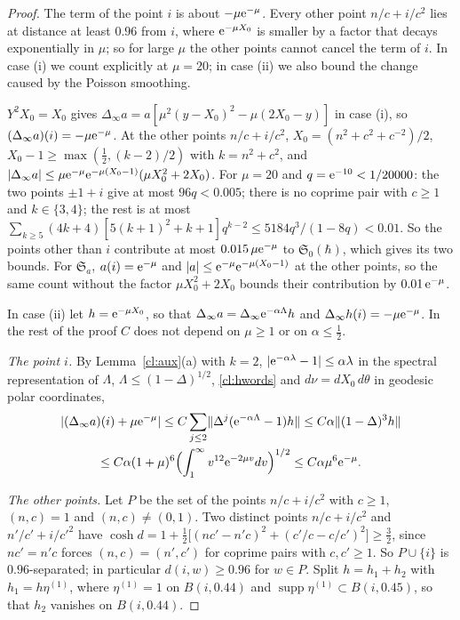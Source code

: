 \begin{proof}
The term of the point $i$ is about $-\mu\mathrm{e}^{-\mu}$. Every other point $n/c+i/c^2$ lies at distance at least $0.96$ from $i$, where
$\mathrm{e}^{-\mu X_0}$ is smaller by a factor that decays exponentially in $\mu$; so for large $\mu$ the other points cannot cancel the
term of $i$. In case (i) we count explicitly at $\mu=20$; in case (ii) we also bound the change caused by the Poisson smoothing.

$Y^2X_0=X_0$ gives $\Delta_\infty a=a[\mu^2(y-X_0)^2-\mu(2X_0-y)]$ in case (i), so $(\Delta_\infty a)(i)=-\mu\mathrm{e}^{-\mu}$. At the other points $n/c+i/c^2$,
$X_0=(n^2+c^2+c^{-2})/2$, $X_0-1\ge\max(\tfrac12,(k-2)/2)$ with $k=n^2+c^2$, and $|\Delta_\infty a|\le\mu\mathrm{e}^{-\mu}\mathrm{e}^{-\mu(X_0-1)}(\mu X_0^2+2X_0)$. For
$\mu=20$ and $q=\mathrm{e}^{-10}<1/20000$: the two points $\pm1+i$ give at most $96q<0.005$; there is no coprime pair with $c\ge1$ and $k\in\{3,4\}$; the rest is
at most $\sum_{k\ge5}(4k+4)[5(k+1)^2+k+1]q^{k-2}\le5184q^3/(1-8q)<0.01$. So the points other than $i$ contribute at most
$0.015\,\mu\mathrm{e}^{-\mu}$ to $\mathfrak S_0(\hbar)$, which gives its two bounds. For $\mathfrak S_a$, $a(i)=\mathrm{e}^{-\mu}$ and $|a|\le\mathrm{e}^{-\mu}\mathrm{e}^{-\mu(X_0-1)}$ at the
other points, so the same count without the factor $\mu X_0^2+2X_0$ bounds their contribution by $0.01\,\mathrm{e}^{-\mu}$.

In case (ii) let $h=\mathrm{e}^{-\mu X_0}$, so that $\Delta_\infty a=\Delta_\infty\mathrm{e}^{-\alpha\Lambda}h$ and $\Delta_\infty h(i)=-\mu\mathrm{e}^{-\mu}$. In the rest of the proof $C$ does
not depend on $\mu\ge1$ or on $\alpha\le\tfrac12$.

\emph{The point $i$.} By Lemma~\ref{cl:aux}(a) with $k=2$, $|\mathrm{e}^{-\alpha\lambda}-1|\le\alpha\lambda$ in the spectral representation of $\Lambda$, $\Lambda\le(1-\Delta)^{1/2}$,
\eqref{cl:hwords} and $d\nu=dX_0\,d\theta$ in geodesic polar coordinates,
\begin{multline*}
|(\Delta_\infty a)(i)+\mu\mathrm{e}^{-\mu}|\le C\sum_{j\le2}\lVert \Delta^j(\mathrm{e}^{-\alpha\Lambda}-1)h\rVert\le C\alpha\lVert (1-\Delta)^3h\rVert\\
\le C\alpha(1+\mu)^6\Bigl(\int_1^\infty v^{12}\mathrm{e}^{-2\mu v}dv\Bigr)^{1/2}\le C\alpha\mu^6\mathrm{e}^{-\mu}.
\end{multline*}

\emph{The other points.} Let $P$ be the set of the points $n/c+i/c^2$ with $c\ge1$, $(n,c)=1$ and $(n,c)\ne(0,1)$. Two distinct points
$n/c+i/c^2$ and $n'/c'+i/c'^2$ have $\cosh d=1+\tfrac12\bigl[(nc'-n'c)^2+(c'/c-c/c')^2\bigr]\ge\tfrac32$, since $nc'=n'c$ forces
$(n,c)=(n',c')$ for coprime pairs with $c,c'\ge1$. So $P\cup\{i\}$ is $0.96$-separated; in particular $d(i,w)\ge0.96$ for $w\in P$. Split
$h=h_1+h_2$ with $h_1=h\eta^{(1)}$, where $\eta^{(1)}=1$ on $B(i,0.44)$ and $\operatorname{supp}\eta^{(1)}\subset B(i,0.45)$, so that $h_2$ vanishes on $B(i,0.44)$.


\end{proof}
